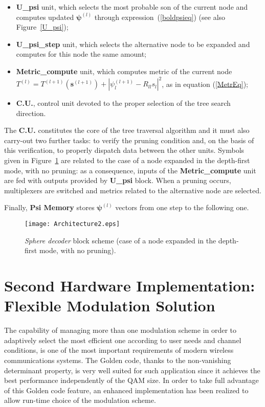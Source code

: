 \documentclass[12pt,onecolumn,draftclsnofoot]{IEEEtran}
\begin{document}
\begin{itemize}
\item \textbf{U\_psi} unit, which selects the most probable son of the current 
node and computes updated $\boldsymbol{\psi}^{(l)}$ through expression~(\ref{boldpsieq}) 
(see also Figure~\ref{U_psi});
\item \textbf{U\_psi\_step} unit, which selects the alternative node to be 
expanded and computes for this node the same amount;

\item \textbf{Metric\_compute} unit, which computes metric of the current node 
$T^{(l)}= T^{(l+1)}(\boldsymbol {s}^{(l+1)})+ | \psi_l^{(l+1)}- R_{ll}s_{l}|^2$, 
as in equation (\ref{MetrEq});

\item \textbf{C.U.}, control unit devoted to the proper selection of the
tree search direction.
\end{itemize}

The {\bf C.U.} constitutes the core of the tree traversal algorithm
and it must also carry-out two further tasks: to verify the pruning
condition and, on the basis of this verification, to properly
dispatch data between the other units. Symbols given in Figure~\ref{Architecture}
are related to the case of a node expanded in the depth-first mode, with
no pruning: as a consequence, inputs of the \textbf{Metric\_compute} unit 
are fed with outputs provided by \textbf{U\_psi} block. When a pruning
occurs, multiplexers are switched and metrics related to the alternative node
are selected.

Finally, \textbf{Psi Memory} stores $\boldsymbol{\psi}^{(l)}$ vectors 
from one step to the following one.

\begin{figure}[ht]
    \begin{center}
    \texttt{[image: Architecture2.eps]}
    \caption{{\it Sphere decoder} block scheme (case of a node expanded in the depth-first mode, with
no pruning). }
    \label{Architecture}
    \end{center}
\end{figure}
\section{Second Hardware Implementation: Flexible Modulation Solution}

\label{HW2}

The capability of managing more than one modulation
scheme in order to adaptively select the most efficient one according to user
needs and channel conditions, is one of the most important requirements of
modern wireless communications systems.
The Golden code, thanks to the non-vanishing determinant property, is
very well suited for such application since it achieves the best performance
independently of the QAM size.
In order to take full advantage of this Golden code feature, an enhanced 
implementation has been realized to allow run-time choice of the modulation 
scheme.
\end{document}
